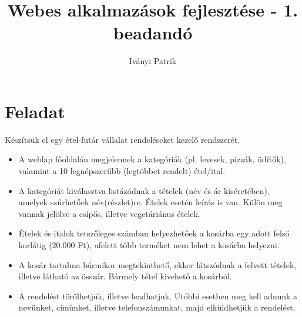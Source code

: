 \documentclass[12pt,a4paper]{article}
\author{Iványi Patrik}
\title{Webes alkalmazások fejlesztése - 1. beadandó}
\begin{document}
\maketitle

\section{Feladat}
Készítsük el egy étel-futár vállalat rendeléseket kezelő rendszerét.
\begin{itemize}
\item A weblap főoldalán megjelennek a kategóriák (pl. levesek, pizzák, üdítők),
 valamint a 10 legnépszerűbb (legtöbbet rendelt) étel/ital.
\item A kategóriát kiválasztva listázódnak a tételek (név és ár kíséretében), amelyek szűrhetőek név(részlet)re. Ételek esetén leírás is van. Külön meg vannak jelölve a csípős, illetve vegetáriánus ételek.
\item Ételek és italok tetszőleges számban helyezhetőek a kosárba egy adott felső korlátig (20.000 Ft),  afelett több terméket nem lehet a kosárba helyezni. 
\item A  kosár  tartalma  bármikor  megtekinthető,  ekkor  látszódnak  a felvett tételek, illetve látható az összár. Bármely tétel kivehető a kosárból.
\item A  rendelést törölhetjük,  illetve leadhatjuk.  Utóbbi  esetben meg   kell adnunk a nevünket, címünket, illetve telefonszámunkat, majd elküldhetjük a rendelést.
\end{itemize}
\end{document}
